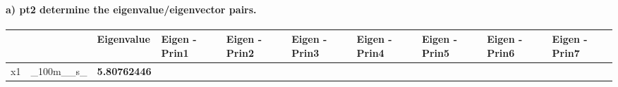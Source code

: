 \documentclass[11pt]{article}
\begin{document}
    \hypertarget{a-pt2-determine-the-eigenvalueeigenvector-pairs.}{%
\paragraph{a) pt2 determine the eigenvalue/eigenvector
pairs.}\label{a-pt2-determine-the-eigenvalueeigenvector-pairs.}}

    \begin{longtable}[]{@{}llllllllll@{}}
\toprule
\begin{minipage}[b]{0.07\columnwidth}\raggedright
\strut
\end{minipage} & \begin{minipage}[b]{0.07\columnwidth}\raggedright
\strut
\end{minipage} & \begin{minipage}[b]{0.07\columnwidth}\raggedright
Eigenvalue\strut
\end{minipage} & \begin{minipage}[b]{0.07\columnwidth}\raggedright
Eigen - Prin1\strut
\end{minipage} & \begin{minipage}[b]{0.07\columnwidth}\raggedright
Eigen - Prin2\strut
\end{minipage} & \begin{minipage}[b]{0.07\columnwidth}\raggedright
Eigen - Prin3\strut
\end{minipage} & \begin{minipage}[b]{0.07\columnwidth}\raggedright
Eigen - Prin4\strut
\end{minipage} & \begin{minipage}[b]{0.07\columnwidth}\raggedright
Eigen - Prin5\strut
\end{minipage} & \begin{minipage}[b]{0.07\columnwidth}\raggedright
Eigen - Prin6\strut
\end{minipage} & \begin{minipage}[b]{0.07\columnwidth}\raggedright
Eigen - Prin7\strut
\end{minipage}\tabularnewline
\midrule
\endhead
\begin{minipage}[t]{0.07\columnwidth}\raggedright
x1\strut
\end{minipage} & \begin{minipage}[t]{0.07\columnwidth}\raggedright
\_100m\_\_s\_\strut
\end{minipage} & \begin{minipage}[t]{0.07\columnwidth}\raggedright
\textbf{5.80762446}\strut
\end{minipage} & \begin{minipage}[t]{0.07\columnwidth}\raggedright

\end{minipage}
\end{longtable}
\end{document}
